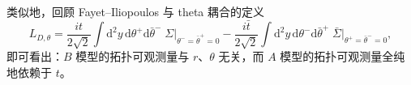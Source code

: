 
类似地，回顾 Fayet--Iliopoulos 与 theta 耦合的定义
\begin{equation}
\tag{3.32}
L_{D,\theta}=\frac{it}{2\sqrt{2}}\int \mathrm{d}^{2}y\,\mathrm{d}\theta^{+}\mathrm{d}\bar\theta^{-}\;\Sigma\big|_{\theta^{-}=\bar\theta^{+}=0}-\frac{i\bar t}{2\sqrt{2}}\int \mathrm{d}^{2}y\,\mathrm{d}\theta^{-}\mathrm{d}\bar\theta^{+}\;\bar\Sigma\big|_{\theta^{+}=\bar\theta^{-}=0},
\end{equation}
即可看出：$B$ 模型的拓扑可观测量与 $r$、$\theta$ 无关，而 $A$ 模型的拓扑可观测量全纯地依赖于 $t$。


